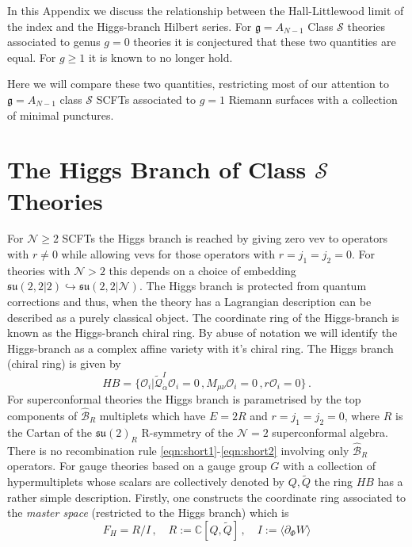 \documentclass[main.tex]{subfiles}
\begin{document}
 
In this Appendix we discuss the relationship between the Hall-Littlewood limit of the index and the Higgs-branch Hilbert series. For $\mathfrak{g}=A_{N-1}$ Class $\mathcal{S}$ theories associated to genus $g=0$ theories it is conjectured that these two quantities are equal. For $g\geq1$ it is known to no longer hold. 

Here we will compare these two quantities, restricting most of our attention to $\mathfrak{g}=A_{N-1}$ class $\mathcal{S}$ SCFTs associated to $g=1$ Riemann surfaces with a collection of minimal punctures.

\section{The Higgs Branch of Class \texorpdfstring{$\mathcal{S}$}{S} Theories}
For $\mathcal{N}\geq2$ SCFTs the Higgs branch is reached by giving zero vev to operators with $r\neq0$ while allowing vevs for those operators with $r=j_1=j_2=0$. For theories with $\mathcal{N}>2$ this depends on a choice of embedding $\mathfrak{su}(2,2|2)\hookrightarrow\mathfrak{su}(2,2|\mathcal{N})$. The Higgs branch is protected from quantum corrections and thus, when the theory has a Lagrangian description can be described as a purely classical object. The coordinate ring of the Higgs-branch is known as the Higgs-branch chiral ring. By abuse of notation we will identify the Higgs-branch as a complex affine variety with it's chiral ring. The Higgs branch (chiral ring) is given by
\begin{equation}
HB=\{\mathcal{O}_i | \widetilde{\mathcal{Q}}^{I}_{\dot{\alpha}}\mathcal{O}_i=0\,, M_{\mu\nu} \mathcal{O}_i=0\,,r\mathcal{O}_i =0 \}\,.
\end{equation}
For superconformal theories the Higgs branch is parametrised by the top components of $\hat{\mathcal{B}}_R$ multiplets which have $E=2R$ and $r=j_1=j_2=0$, where $R$ is the Cartan of the $\mathfrak{su}(2)_R$ R-symmetry of the $\mathcal{N}=2$ superconformal algebra. There is no recombination rule \eqref{eqn:short1}-\eqref{eqn:short2} involving only $\hat{\mathcal{B}}_R$ operators.
For gauge theories based on a gauge group $G$ with a collection of hypermultiplets whose scalars are collectively denoted by $Q,\widetilde{Q}$ the ring $HB$ has a rather simple description. Firstly, one constructs the coordinate ring associated to the \textit{master space} (restricted to the Higgs branch) which is
\begin{equation}
F_H=R/I\,,\quad R:=\mathbb{C}[Q,\widetilde{Q}]\,,\quad I:=\langle \partial_{\Phi}W\rangle
\end{equation}
\end{document}
